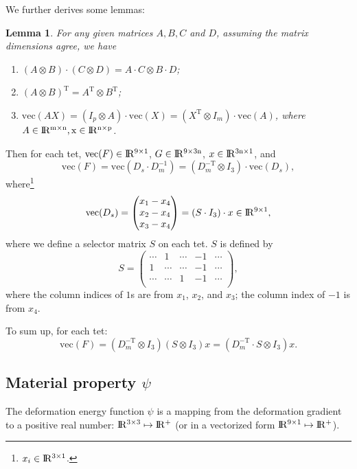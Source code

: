 \documentclass{fancydoc}
\newtheorem{lemma}{Lemma}
\newcommand{\trans}{\mathrm{T}}
\newcommand{\realR}{\rm I\!R}
\begin{document}
We further derives some lemmas:
\begin{lemma}
	For any given matrices $A, B, C$ and $D$, assuming the matrix dimensions agree, we have 
	\begin{enumerate}
		\item $(A \otimes B) \cdot (C \otimes D) = A \cdot C \otimes B \cdot D$;
		\item $(A \otimes B)^\trans  = A^\trans \otimes B^\trans$;
		\item $\mathrm{vec}(AX) = (I_p \otimes A) \cdot \mathrm{vec}(X) = (X^\trans \otimes I_m) \cdot \mathrm{vec}(A)$, where $A \in \realR^{m \times n}, x \in \realR^{n \times p}$.
	\end{enumerate}
\end{lemma}
Then for each tet, $\mathrm{vec}(F) \in \realR^{9 \times 1}$, $G \in \realR^{9 \times 3n}$, $x \in \realR^{3n \times 1}$, and
\begin{equation}
	\mathrm{vec}(F)  = \mathrm{vec}(D_s \cdot D_m^{-1}) = (D_m^{-\trans} \otimes I_3) \cdot \mathrm{vec}(D_s),
\end{equation}
where\footnote{$x_i \in \realR^{3 \times 1}$. }
\begin{equation}
\mathrm{vec}(D_s) = \begin{pmatrix}
x_1 - x_4 \\
x_2 - x_4 \\
x_3 - x_4
\end{pmatrix}  = (S \cdot I_3) \cdot x \in \realR^{9 \times 1}, 
\end{equation}
where we define a selector matrix $S$ on each tet. $S$ is defined by
\begin{equation}
	S = \begin{pmatrix}
	\cdots & 1 & \cdots & -1  & \cdots \\
	1 & \cdots  & \cdots  & -1 & \cdots \\
	  \cdots  &  \cdots & 1 & -1 & \cdots \\
	\end{pmatrix},
\end{equation}
where the column indices of $1$s are from $x_1$, $x_2$, and $x_3$; the column index of $-1$ is from $x_4$.

To sum up, for each tet:
\begin{equation}
\mathrm{vec}(F) = (D_m^{-\trans} \otimes I_3) ( S \otimes I_3) x = (D_m^{-\trans} \cdot S \otimes I_3) x.
\end{equation}

\subsection{Material property $\psi$}
The deformation energy function $\psi$ is a mapping from the deformation gradient to a positive real number: $\realR^{3\times 3} \mapsto \realR^+$ (or in a vectorized form $\realR^{9 \times 1} \mapsto \realR^+$).
\end{document}
